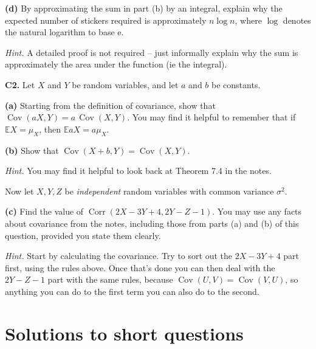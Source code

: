 \documentclass[
  a4paper,
]{book}
\theoremstyle{definition}
\theoremstyle{definition}
\theoremstyle{definition}
\theoremstyle{definition}
\theoremstyle{remark}
\begin{document}
\textbf{(d)} By approximating the sum in part (b) by an integral, explain why the expected number of stickers required is approximately \(n \log n\), where \(\log\) denotes the natural logarithm to base \(\mathrm e\).

\begin{myanswers}
\emph{Hint.} A detailed proof is not required -- just informally explain why the sum is approximately the area under the function (ie the integral).

\end{myanswers}

\textbf{C2.} Let \(X\) and \(Y\) be random variables, and let \(a\) and \(b\) be constants.

\textbf{(a)} Starting from the definition of covariance, show that \(\operatorname{Cov}(aX, Y) = a\,\operatorname{Cov}(X,Y)\). You may find it helpful to remember that if \(\mathbb EX = \mu_X\), then \(\mathbb EaX = a\mu_X\).

\textbf{(b)} Show that \(\operatorname{Cov}(X + b, Y) = \operatorname{Cov}(X, Y)\).

\begin{myanswers}
\emph{Hint.} You may find it helpful to look back at Theorem 7.4 in the notes.

\end{myanswers}

Now let \(X, Y, Z\) be \emph{independent} random variables with common variance \(\sigma^2\).

\textbf{(c)} Find the value of \(\operatorname{Corr}(2X - 3Y + 4, 2Y - Z - 1)\). You may use any facts about covariance from the notes, including those from parts (a) and (b) of this question, provided you state them clearly.

\begin{myanswers}
\emph{Hint.} Start by calculating the covariance. Try to sort out the \(2X - 3Y + 4\) part first, using the rules above. Once that's done you can then deal with the \(2Y - Z -1\) part with the same rules, because \(\operatorname{Cov}(U, V) = \operatorname{Cov}(V,U)\), so anything you can do to the first term you can also do to the second.

\end{myanswers}

\hypertarget{P4-short-sols}{%
\section*{Solutions to short questions}\label{P4-short-sols}}
\end{document}

